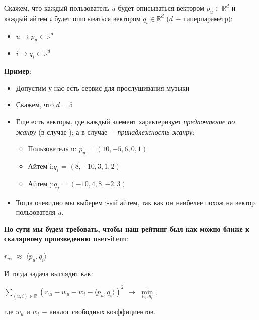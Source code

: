         Скажем, что каждый пользователь $u$ будет описываться вектором $p_u \in \mathbb{R}^d$ и каждый айтем $i$ будет описываться вектором $q_i \in \mathbb{R}^d$ ($d$ $-$ гиперпараметр):
        \begin{itemize}
            \item $u \to p_u \in \mathbb{R}^d$
            \item $i \to q_i \in \mathbb{R}^d$
        \end{itemize}

        \textbf{Пример}:
        \begin{itemize}
            \item Допустим у нас есть сервис для прослушивания музыки
            \item Скажем, что $d = 5$
            \item Еще есть векторы, где каждый элемент характеризует \textit{предпочтение по жанру} (в случае ); а в случае  $-$ \textit{принадлежность жанру}:
                \begin{itemize}
                    \item Пользователь u: \quad  $p_u$ = $(10, -5, 6, 0, 1)$
                    \item Айтем i:\quad $q_i$ = $(8, -10, 3, 1, 2)$
                    \item Айтем j:\quad $q_j$ = $(-10, 4, 8, -2, 3)$
                \end{itemize}
            \item Тогда очевидно мы выберем i-ый айтем, так как он наибелее похож на вектор пользователя $u$.
        \end{itemize}

        \begin{center}
            \textbf{По сути мы будем требовать, чтобы наш рейтинг был как можно ближе к скалярному произведению user-item}:
        \end{center}
        \begin{center}
        \Large
            $r_{ui}$ $\approx$ $\langle p_u, q_i \rangle$
        \end{center}

        И тогда задача выглядит как:
        \begin{center}
        \Large
            $\sum\limits_{(u, i) \in \mathbb{R}}(r_{ui} - w_{u} - w_i - \langle p_u, q_i \rangle)^2$ $\longrightarrow$ $\min\limits_{p_u, q_i}$,
        \end{center}
        где $w_u$ и $w_i$ $-$ аналог свободных коэффициентов.

